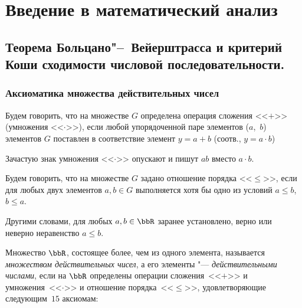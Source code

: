 \part{Введение в математический анализ}
\chapter{Теорема Больцано"--~Вейерштрасса и критерий Коши сходимости числовой последовательности.}

\section[Аксиоматика множества действительных чисел]{Аксиоматика множества действительных чисел}

\begin{defn}
Будем говорить, что на множестве $G$ определена операция сложения <<$+$>> (умножения <<$\cdot$>>), если любой упорядоченной паре элементов ($a$,~$b$) элементов $G$ поставлен в соответствие элемент $y = a + b$ (соотв., $y = a\cdot b$)
\end{defn}

Зачастую знак умножения <<$\cdot$>> опускают и пишут $ab$ вместо $a\cdot b$.

\begin{defn}
Будем говорить, что на множестве $G$ задано отношение порядка <<$\le$>>, если для любых двух элементов $a,b\in G$ выполняется хотя бы одно из условий $a\le b$, $b \le a$.
\end{defn}

Другими словами, для любых $a, b \in \bbR$ заранее установлено, верно или неверно неравенство $a \le b$.

\begin{defn}
Множество $\bbR$, состоящее более, чем из одного элемента, называется \textit{множеством действительных чисел}, а его элементы "--- \textit{действительными числами}, если на $\bbR$ определены операции сложения~<<$+$>> и умножения~<<$\cdot$>> и отношение порядка~<<$\le$>>, удовлетворяющие следующим~$15$ аксиомам:
\end{defn}

